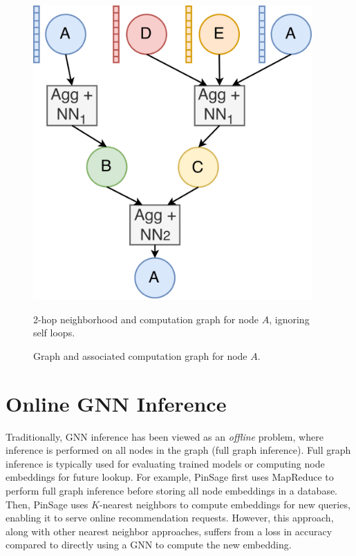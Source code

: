\begin{figure}[h!]
\begin{minipage}[c]{0.45\textwidth}
        \includegraphics[width=0.95\textwidth]{diagrams/group_meeting_gnn-GNN Execution.png}
        \caption{2-hop neighborhood and computation graph for node $A$, ignoring self loops.}
    \end{minipage}
    \caption{Graph and associated computation graph for node $A$.}
    \label{Background: GNN Execution Example}
\end{figure}    

\section{Online GNN Inference}
Traditionally, GNN inference has been viewed as an \textit{offline} problem, where inference is performed on all nodes in the graph (full graph inference).
Full graph inference is typically used for evaluating trained models or computing node embeddings for future lookup. 
For example, PinSage \cite{Recsys_PinSAGE_2018} first uses MapReduce \cite{MapReduce_2004} to perform full graph inference before storing all node embeddings in a database.
Then, PinSage uses $K$-nearest neighbors to compute embeddings for new queries, enabling it to serve online recommendation requests.
However, this approach, along with other nearest neighbor approaches, suffers from a loss in accuracy compared to directly using a GNN to compute the new embedding.

